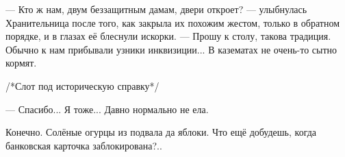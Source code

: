 --- Кто ж нам, двум беззащитным дамам, двери откроет? --- улыбнулась Хранительница после того,
как закрыла их похожим жестом, только в обратном порядке, и в глазах её блеснули искорки. ---
Прошу к столу, такова традиция. Обычно к нам прибывали узники инквизиции... В казематах не очень-то сытно кормят.

/*Слот под историческую справку*/

--- Спасибо... Я тоже... Давно нормально не ела.

Конечно. Солёные огурцы из подвала да яблоки. Что ещё добудешь, когда банковская карточка заблокирована?..



